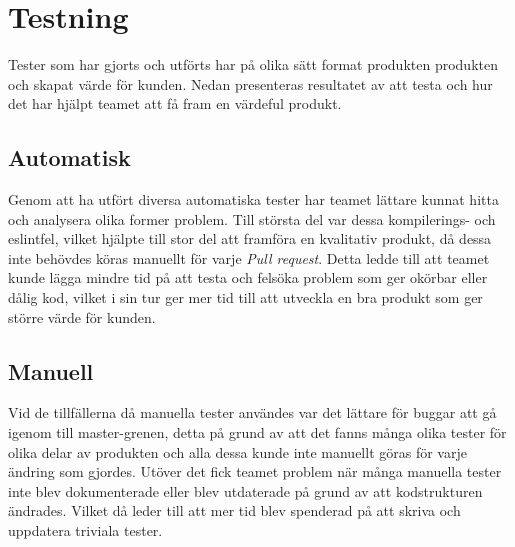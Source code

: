 \section{Testning}
Tester som har gjorts och utförts har på olika sätt format produkten produkten och skapat värde för kunden. Nedan presenteras resultatet av att testa och hur det har hjälpt teamet att få fram en värdeful produkt.

\subsection{Automatisk}
Genom att ha utfört diversa automatiska tester har teamet lättare kunnat hitta och analysera olika former problem. Till största del var dessa kompilerings- och eslintfel, vilket hjälpte till stor del att framföra en kvalitativ produkt, då dessa inte behövdes köras manuellt för varje \textit{Pull request}. Detta ledde till att teamet kunde lägga mindre tid på att testa och felsöka problem som ger okörbar eller dålig kod, vilket i sin tur ger mer tid till att utveckla en bra produkt som ger större värde för kunden.  

\subsection{Manuell}
Vid de tillfällerna då manuella tester användes var det lättare för buggar att gå igenom till master-grenen, detta på grund av att det fanns många olika tester för olika delar av produkten och alla dessa kunde inte manuellt göras för varje ändring som gjordes. Utöver det fick teamet problem när många manuella tester inte blev dokumenterade eller blev utdaterade på grund av att kodstrukturen ändrades. Vilket då leder till att mer tid blev spenderad på att skriva och uppdatera triviala tester. 

